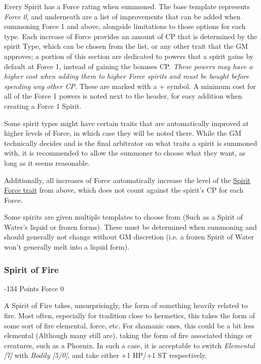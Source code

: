 \begin{multicols*}{3}
	Every Spirit has a Force rating when summoned. The base template represents \textit{Force 0}, and underneath are a list of improvements that can be added when summoning Force 1 and above, alongside limitations to those options for each type. Each increase of Force provides an amount of CP that is determined by the spirit Type, which can be chosen from the list, or any other trait that the GM approves; a portion of this section are dedicated to powers that a spirit gains by default at Force 1, instead of gaining the bonuses CP. \textit{These powers may have a higher cost when adding them to higher Force spirits and must be bought before spending any other CP.} These are marked with a + symbol. A minimum cost for all of the Force 1 powers is noted next to the header, for easy addition when creating a Force 1 Spirit.
	
	Some spirit types might have certain traits that are automatically improved at higher levels of Force, in which case they will be noted there. While the GM technically decides and is the final arbitrator on what traits a spirit is summoned with, it is recommended to allow the summoner to choose what they want, as long as it seems reasonable.
	
	Additionally, all increases of Force automatically increase the level of the \hyperref[spirit_force]{Spirit Force trait} from above, which does not count against the spirit's CP for each Force.
	
	Some spirits are given multiple templates to choose from (Such as a Spirit of Water's liquid or frozen forms). These must be determined when summoning and should generally not change without GM discretion (i.e. a frozen Spirit of Water won't generally melt into a liquid form).
	
	\subsubsection{Spirit of Fire}
	\begin{flushright}
		-134 Points Force 0
	\end{flushright}
	
	A Spirit of Fire takes, unsurprisingly, the form of something heavily related to fire. Most often, especially for tradition close to hermetics, this takes the form of some sort of fire elemental, force, etc. For shamanic ones, this could be a bit less elemental (Although many still are), taking the form of fire associated things or creatures, such as a Phoenix. In such a case, it is acceptable to switch \textit{Elemental [7]} with \textit{Bodily [5/0]}, and take either +1 HP/+1 ST respectively.
	

\end{multicols*}
